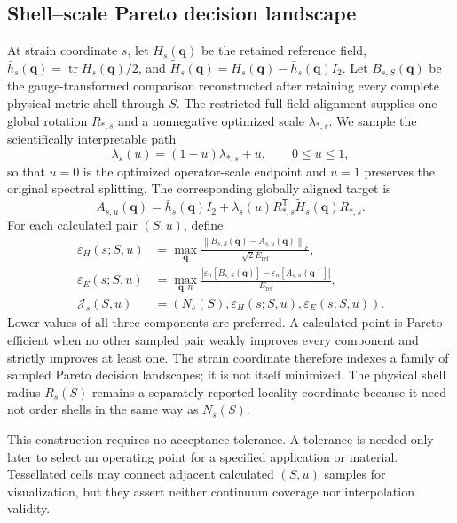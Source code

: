 \documentclass[11pt]{article}
\newcommand{\norm}[1]{\left\lVert #1\right\rVert}
\begin{document}
\subsection{Shell--scale Pareto decision landscape}

At strain coordinate $s$, let $H_s(\mathbf q)$ be the retained reference field,
$\bar h_s(\mathbf q)=\operatorname{tr}H_s(\mathbf q)/2$, and
$\widetilde H_s(\mathbf q)=H_s(\mathbf q)-\bar h_s(\mathbf q) I_2$. Let
$B_{s,S}(\mathbf q)$ be the gauge-transformed
comparison reconstructed after retaining every complete physical-metric shell through
$S$. The restricted full-field alignment supplies one global rotation $R_{*,s}$ and a
nonnegative optimized scale $\lambda_{*,s}$. We sample the scientifically interpretable
path
\begin{equation}
 \lambda_s(u)=(1-u)\lambda_{*,s}+u,
 \qquad 0\le u\le1,
 \label{eq:scale-path}
\end{equation}
so that $u=0$ is the optimized operator-scale endpoint and $u=1$ preserves the original
spectral splitting. The corresponding globally aligned target is
\begin{equation}
 A_{s,u}(\mathbf q)=\bar h_s(\mathbf q)I_2+
 \lambda_s(u)R_{*,s}^{\mathsf T}\widetilde H_s(\mathbf q)R_{*,s}.
 \label{eq:scale-path-target}
\end{equation}
For each calculated pair $(S,u)$, define
\begin{align}
 \varepsilon_H(s;S,u)
 &=\max_{\mathbf q}\frac{\norm{B_{s,S}(\mathbf q)-A_{s,u}(\mathbf q)}_F}
 {\sqrt2E_{\mathrm{ref}}},\\
 \varepsilon_E(s;S,u)
 &=\max_{\mathbf q,n}\frac{
 \left|\varepsilon_n[B_{s,S}(\mathbf q)]-
 \varepsilon_n[A_{s,u}(\mathbf q)]\right|}{E_{\mathrm{ref}}},\\
 \mathcal J_s(S,u)
 &=\left(N_s(S),\varepsilon_H(s;S,u),\varepsilon_E(s;S,u)\right).
 \label{eq:pareto-decision-objectives}
\end{align}
Lower values of all three components are preferred. A calculated point is Pareto
efficient when no other sampled pair weakly improves every component and strictly
improves at least one. The strain coordinate therefore indexes a family of sampled
Pareto decision landscapes; it is not itself minimized. The physical shell radius
$R_s(S)$ remains a separately reported locality coordinate because it need not order
shells in the same way as $N_s(S)$.

This construction requires no acceptance tolerance. A tolerance is needed only later to
select an operating point for a specified application or material. Tessellated cells may
connect adjacent calculated $(S,u)$ samples for visualization, but they assert neither
continuum coverage nor interpolation validity.
\end{document}
